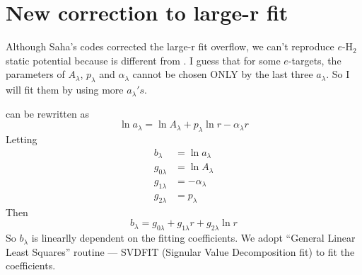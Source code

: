 \documentclass[aps,pra,groupedaddress,
                amsfonts,amssymb,
                preprint
    ]{revtex4}
\begin{document}
\section{New correction to large-r fit}
Although Saha's codes corrected the large-r fit overflow, we can't
reproduce $e$-H$_2$ static potential because  is different
from . I guess that for some $e$-targets, the parameters of
$A_\lambda$, $p_\lambda$ and $\alpha_\lambda$ cannot be chosen ONLY by
the last three $a_\lambda$. So I will fit them by using more
$a_\lambda's$.

 can be rewritten as
\begin{equation}
  \label{eq:lalog}
  \ln a_\lambda = \ln A_\lambda + p_\lambda\ln r - \alpha_\lambda r
\end{equation}
Letting 
\begin{subequations}
  \begin{align}
    \label{eq:lalp}
    b_\lambda & = \ln a_\lambda \\
    g_{0\lambda} & = \ln A_\lambda \\
    g_{1\lambda} & = -\alpha_\lambda \\
    g_{2\lambda} & = p_\lambda
  \end{align}
\end{subequations}
Then
\begin{equation}
  \label{eq:lallog2}
  b_\lambda = g_{0\lambda} + g_{1\lambda}r + g_{2\lambda}\ln r
\end{equation}
So $b_\lambda$ is linearlly dependent on the fitting coefficients. We
adopt ``General Linear Least Squares'' routine --- SVDFIT (Signular
Value Decomposition fit) \cite{PTV1992} to fit the coefficients.
\end{document}
